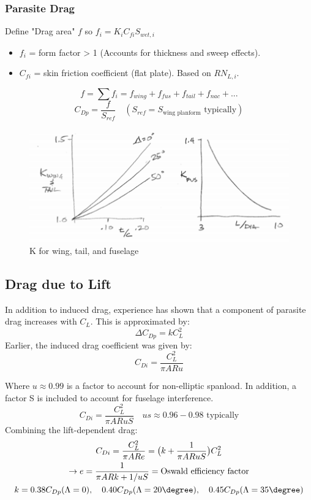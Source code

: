 \documentclass[draft=false, titlepage]{article}
\begin{document}
\subsubsection{Parasite Drag}
	Define "Drag area" $f$ so $f_i = K_i C_{fi} S_{wet,i}$
	\begin{itemize}
		\item $f_i$ = form factor > 1 (Accounts for thickness and sweep effects).
		\item $C_{fi}$ = skin friction coefficient (flat plate). Based on $RN_{L,i}$.
	\end{itemize}
\begin{equation}
f = \sum f_i = f_{wing} + f_{fus} + f_{tail} + f_{nac} + ...
\label{eq:dragArea}
\end{equation}
\begin{equation*}
C_{Dp} = \frac{f}{S_{ref}} \quad (S_{ref} = S_{\text{wing planform}} \text{ typically})
\end{equation*}

\begin{figure}[ht]
	\centering
	\includegraphics[width=0.8\linewidth]{Figures/p62_KWingAndTail.PNG}
	\caption{K for wing, tail, and fuselage}
	\label{fig:p62_KWingAndTail}
\end{figure}

\subsection{Drag due to Lift}
In addition to induced drag, experience has shown that a component of parasite drag increases with $C_L$. This is approximated by:
\begin{equation*}
\Delta C_{Dp} = kC_L^2
\end{equation*}
Earlier, the induced drag coefficient was given by:
\begin{equation*}
C_{Di} = \frac{C_L^2}{\pi AR u}
\end{equation*}

Where $u \approx 0.99$ is a factor to account for non-elliptic spanload. In addition, a factor S is included to account for fuselage interference.
\begin{equation}
C_{Di} = \frac{C_L^2}{\pi AR uS} \quad us \approx 0.96 - 0.98 \text{ typically}
\end{equation}
Combining the lift-dependent drag:
\begin{gather*}
C_{Di} = \frac{C_L^2}{\pi AR e} = \big( k + \frac{1}{\pi AR uS} \big) C_L^2\\
\rightarrow e = \frac{1}{\pi AR k + 1/uS} = \text{Oswald efficiency factor}\\
k = 0.38 C_{Dp} (\Lambda=0),\quad 0.40C_{Dp}(\Lambda = 20\degree),\quad 0.45 C_{Dp} (\Lambda = 35\degree)
\end{gather*}
\end{document}
